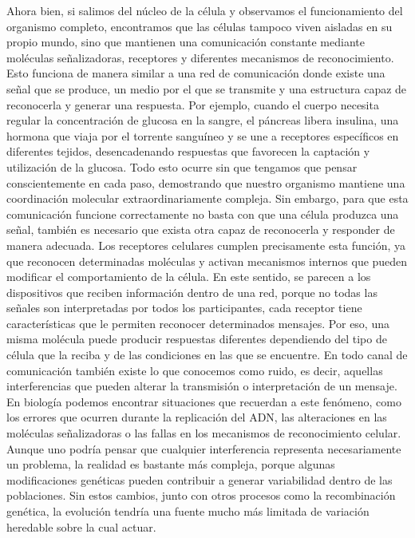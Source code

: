 \documentclass[12pt]{article}
\begin{document}
Ahora bien, si salimos del núcleo de la célula y observamos el funcionamiento del organismo completo, encontramos que las células tampoco viven aisladas en su propio mundo, sino que mantienen una comunicación constante mediante moléculas señalizadoras, receptores y diferentes mecanismos de reconocimiento. Esto funciona de manera similar a una red de comunicación donde existe una señal que se produce, un medio por el que se transmite y una estructura capaz de reconocerla y generar una respuesta. Por ejemplo, cuando el cuerpo necesita regular la concentración de glucosa en la sangre, el páncreas libera insulina, una hormona que viaja por el torrente sanguíneo y se une a receptores específicos en diferentes tejidos, desencadenando respuestas que favorecen la captación y utilización de la glucosa. Todo esto ocurre sin que tengamos que pensar conscientemente en cada paso, demostrando que nuestro organismo mantiene una coordinación molecular extraordinariamente compleja.
Sin embargo, para que esta comunicación funcione correctamente no basta con que una célula produzca una señal, también es necesario que exista otra capaz de reconocerla y responder de manera adecuada. Los receptores celulares cumplen precisamente esta función, ya que reconocen determinadas moléculas y activan mecanismos internos que pueden modificar el comportamiento de la célula. En este sentido, se parecen a los dispositivos que reciben información dentro de una red, porque no todas las señales son interpretadas por todos los participantes, cada receptor tiene características que le permiten reconocer determinados mensajes. Por eso, una misma molécula puede producir respuestas diferentes dependiendo del tipo de célula que la reciba y de las condiciones en las que se encuentre.
En todo canal de comunicación también existe lo que conocemos como ruido, es decir, aquellas interferencias que pueden alterar la transmisión o interpretación de un mensaje. En biología podemos encontrar situaciones que recuerdan a este fenómeno, como los errores que ocurren durante la replicación del ADN, las alteraciones en las moléculas señalizadoras o las fallas en los mecanismos de reconocimiento celular. Aunque uno podría pensar que cualquier interferencia representa necesariamente un problema, la realidad es bastante más compleja, porque algunas modificaciones genéticas pueden contribuir a generar variabilidad dentro de las poblaciones. Sin estos cambios, junto con otros procesos como la recombinación genética, la evolución tendría una fuente mucho más limitada de variación heredable sobre la cual actuar.
\end{document}
